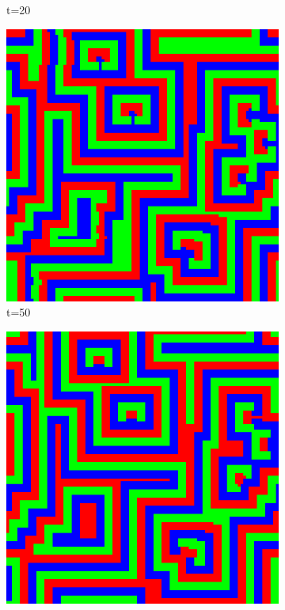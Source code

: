 \documentclass[a4paper, 11pt]{article}
\begin{document}
\begin{landscape}
\begin{figure}[H]
\begin{subfigure}{.20\textwidth}
  \caption{t=20}
\end{subfigure}%
\begin{subfigure}{.20\textwidth}
  \centering
  \includegraphics[width=0.95\linewidth]{ROCK_PAPER_SCISSORS_MOORE_100x100_HighRockPop50_t50}
  \caption{t=50}
\end{subfigure}%
\begin{subfigure}{.20\textwidth}
  \centering
  \includegraphics[width=0.95\linewidth]{ROCK_PAPER_SCISSORS_MOORE_100x100_HighRockPop50_t75}

\end{subfigure}
\end{figure}
\end{landscape}
\end{document}
